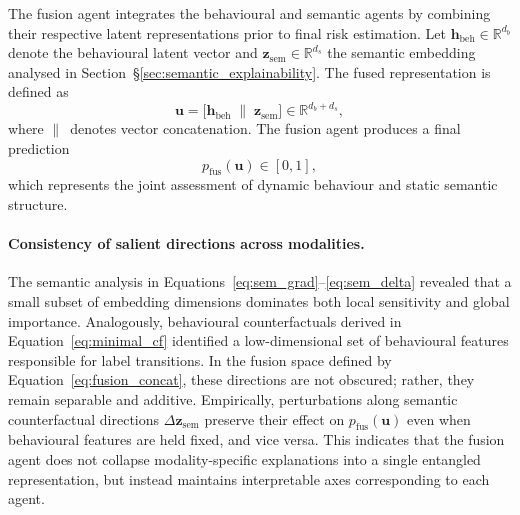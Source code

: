\documentclass[3p]{elsarticle}
\begin{document}
The fusion agent integrates the behavioural and semantic agents by combining their respective latent representations prior to final risk estimation.
Let $\mathbf{h}_{\mathrm{beh}} \in \mathbb{R}^{d_b}$ denote the behavioural latent vector
and $\mathbf{z}_{\mathrm{sem}} \in \mathbb{R}^{d_s}$ the semantic embedding analysed in
Section~\S\ref{sec:semantic_explainability}.
The fused representation is defined as
\begin{equation}
\mathbf{u}
=
\big[
\mathbf{h}_{\mathrm{beh}} \;\|\; \mathbf{z}_{\mathrm{sem}}
\big]
\in \mathbb{R}^{d_b + d_s},
\label{eq:fusion_concat}
\end{equation}
where $\|\,$ denotes vector concatenation.
The fusion agent produces a final prediction
\begin{equation}
p_{\mathrm{fus}}(\mathbf{u}) \in [0,1],
\label{eq:fus_pred}
\end{equation}
which represents the joint assessment of dynamic behaviour and static semantic structure.

\vspace{0.3em}
\paragraph{Consistency of salient directions across modalities.}
The semantic analysis in Equations~\eqref{eq:sem_grad}--\eqref{eq:sem_delta} revealed that
a small subset of embedding dimensions dominates both local sensitivity and global
importance.
Analogously, behavioural counterfactuals derived in
Equation~\eqref{eq:minimal_cf} identified a low-dimensional set of behavioural features
responsible for label transitions.
In the fusion space defined by Equation~\eqref{eq:fusion_concat}, these directions are not
obscured; rather, they remain separable and additive.
Empirically, perturbations along semantic counterfactual directions
$\Delta \mathbf{z}_{\mathrm{sem}}$ preserve their effect on
$p_{\mathrm{fus}}(\mathbf{u})$ even when behavioural features are held fixed, and vice
versa.
This indicates that the fusion agent does not collapse modality-specific explanations into
a single entangled representation, but instead maintains interpretable axes corresponding
to each agent.

\vspace{0.3em}
\end{document}

